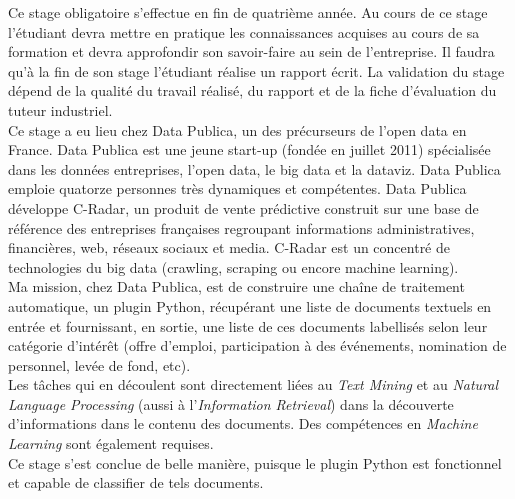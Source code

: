 Ce stage obligatoire s'effectue en fin de quatrième année. Au cours de ce stage l'étudiant devra mettre en pratique les connaissances acquises au cours de sa formation et devra approfondir son savoir-faire au sein de l'entreprise. Il faudra qu'à  la fin de son stage l'étudiant réalise un rapport écrit. La validation du stage dépend de la qualité du travail réalisé, du rapport et de la fiche d'évaluation du tuteur industriel.\\
Ce stage a eu lieu chez Data Publica, un des précurseurs de l'open data en France. Data Publica est une jeune start-up (fondée en juillet 2011) spécialisée dans les données entreprises, l'open data, le big data et la dataviz. Data Publica emploie quatorze personnes très dynamiques et compétentes. Data Publica développe C-Radar, un produit de vente prédictive construit sur une base de référence des entreprises françaises regroupant informations administratives, financières, web, réseaux sociaux et media. C-Radar est un concentré de technologies du big data (crawling, scraping ou encore machine learning).\\
Ma mission, chez Data Publica, est de construire une chaîne de traitement automatique, un plugin Python, récupérant une liste de documents textuels en entrée et fournissant, en sortie, une liste de ces documents labellisés selon leur catégorie d'intérêt (offre d'emploi, participation à des événements, nomination de personnel, levée de fond, etc).\\
Les tâches qui en découlent sont directement liées au \textit{Text Mining} et au \textit{Natural Language Processing} (aussi à l'\textit{Information Retrieval}) dans la découverte d'informations dans le contenu des documents. Des compétences en \textit{Machine Learning} sont également requises.\\
Ce stage s'est conclue de belle manière, puisque le plugin Python est fonctionnel et capable de classifier de tels documents.